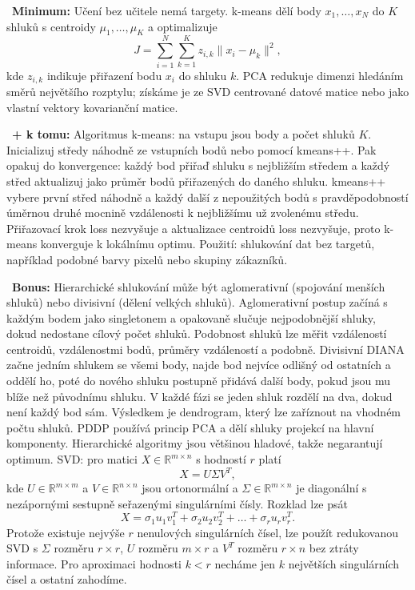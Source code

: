\begin{odpoved}
\setlength{\parskip}{2pt}
\noindent{}\ \textbf{Minimum:} Učení bez učitele nemá targety. k-means dělí body $x_1,\dots,x_N$ do $K$ shluků s centroidy $\mu_1,\dots,\mu_K$ a optimalizuje
\[
J=\sum_{i=1}^N\sum_{k=1}^K z_{i,k}\|x_i-\mu_k\|^2,
\]
kde $z_{i,k}$ indikuje přiřazení bodu $x_i$ do shluku $k$. PCA redukuje dimenzi hledáním směrů největšího rozptylu; získáme je ze SVD centrované datové matice nebo jako vlastní vektory kovarianční matice.\par
\noindent{}\ \textbf{+ k tomu:} Algoritmus k-means: na vstupu jsou body a počet shluků $K$. Inicializuj středy náhodně ze vstupních bodů nebo pomocí kmeans++. Pak opakuj do konvergence: každý bod přiřaď shluku s nejbližším středem a každý střed aktualizuj jako průměr bodů přiřazených do daného shluku. kmeans++ vybere první střed náhodně a každý další z nepoužitých bodů s pravděpodobností úměrnou druhé mocnině vzdálenosti k nejbližšímu už zvolenému středu. Přiřazovací krok loss nezvyšuje a aktualizace centroidů loss nezvyšuje, proto k-means konverguje k lokálnímu optimu. Použití: shlukování dat bez targetů, například podobné barvy pixelů nebo skupiny zákazníků.\par
\noindent{}\ \textbf{Bonus:} Hierarchické shlukování může být aglomerativní (spojování menších shluků) nebo divisivní (dělení velkých shluků). Aglomerativní postup začíná s každým bodem jako singletonem a opakovaně slučuje nejpodobnější shluky, dokud nedostane cílový počet shluků. Podobnost shluků lze měřit vzdáleností centroidů, vzdálenostmi bodů, průměry vzdáleností a podobně. Divisivní DIANA začne jedním shlukem se všemi body, najde bod nejvíce odlišný od ostatních a oddělí ho, poté do nového shluku postupně přidává další body, pokud jsou mu blíže než původnímu shluku. V každé fázi se jeden shluk rozdělí na dva, dokud není každý bod sám. Výsledkem je dendrogram, který lze zaříznout na vhodném počtu shluků. PDDP používá princip PCA a dělí shluky projekcí na hlavní komponenty. Hierarchické algoritmy jsou většinou hladové, takže negarantují optimum.
SVD: pro matici $X\in\mathbb R^{m\times n}$ s hodností $r$ platí
\[
X=U\Sigma V^T,
\]
kde $U\in\mathbb R^{m\times m}$ a $V\in\mathbb R^{n\times n}$ jsou ortonormální a $\Sigma\in\mathbb R^{m\times n}$ je diagonální s nezápornými sestupně seřazenými singulárními čísly. Rozklad lze psát
\[
X=\sigma_1u_1v_1^T+\sigma_2u_2v_2^T+\dots+\sigma_ru_rv_r^T.
\]
Protože existuje nejvýše $r$ nenulových singulárních čísel, lze použít redukovanou SVD s $\Sigma$ rozměru $r\times r$, $U$ rozměru $m\times r$ a $V^T$ rozměru $r\times n$ bez ztráty informace. Pro aproximaci hodnosti $k<r$ necháme jen $k$ největších singulárních čísel a ostatní zahodíme.

\end{odpoved}
